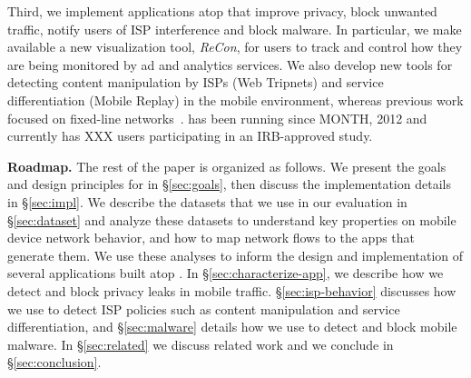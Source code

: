 Third, we implement applications atop \meddle that improve 
privacy, block unwanted traffic, notify users of ISP interference and block malware. 
In particular, we make available a new visualization tool, \emph{ReCon}, for users to track and control how 
they are being monitored by ad and analytics services. 
 We also develop new tools for detecting content manipulation by ISPs (Web Tripnets) and 
 service differentiation (Mobile Replay) in the mobile environment, whereas previous work focused on 
 fixed-line networks~\cite{reis:tripwires,dischinger:glasnost}. 
\meddle has been running since 
MONTH, 2012 and currently has XXX users participating in an IRB-approved study. 






\noindent\textbf{Roadmap.} The rest of the paper is organized as follows. We present the goals and design principles for \meddle in \S\ref{sec:goals}, then 
discuss the implementation details in \S\ref{sec:impl}. We describe the datasets that we use in our evaluation in \S\ref{sec:dataset} and 
analyze these datasets to understand key properties on mobile device network behavior, and how to map network flows to the 
apps that generate them. We use these analyses to inform the design and implementation of several applications built atop \meddle. 
In \S\ref{sec:characterize-app}, we describe how we detect and block privacy leaks in mobile traffic. \S\ref{sec:isp-behavior} discusses 
how we use \meddle to detect ISP policies such as content manipulation and service differentiation, and \S\ref{sec:malware} details 
how we use \meddle to detect and block mobile malware. In \S\ref{sec:related} we discuss related work and we conclude in \S\ref{sec:conclusion}.


